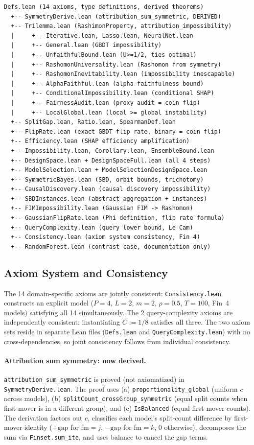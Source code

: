 \documentclass{jmlr}
\begin{document}
{\small
\begin{verbatim}
Defs.lean (14 axioms, type definitions, derived theorems)
  +-- SymmetryDerive.lean (attribution_sum_symmetric, DERIVED)
  +-- Trilemma.lean (RashimonProperty, attribution_impossibility)
  |     +-- Iterative.lean, Lasso.lean, NeuralNet.lean
  |     +-- General.lean (GBDT impossibility)
  |     +-- UnfaithfulBound.lean (U>=1/2, ties optimal)
  |     +-- RashomonUniversality.lean (Rashomon from symmetry)
  |     +-- RashomonInevitability.lean (impossibility inescapable)
  |     +-- AlphaFaithful.lean (alpha-faithfulness bound)
  |     +-- ConditionalImpossibility.lean (conditional SHAP)
  |     +-- FairnessAudit.lean (proxy audit = coin flip)
  |     +-- LocalGlobal.lean (local >= global instability)
  +-- SplitGap.lean, Ratio.lean, SpearmanDef.lean
  +-- FlipRate.lean (exact GBDT flip rate, binary = coin flip)
  +-- Efficiency.lean (SHAP efficiency amplification)
  +-- Impossibility.lean, Corollary.lean, EnsembleBound.lean
  +-- DesignSpace.lean + DesignSpaceFull.lean (all 4 steps)
  +-- ModelSelection.lean + ModelSelectionDesignSpace.lean
  +-- SymmetricBayes.lean (SBD, orbit bounds, trichotomy)
  +-- CausalDiscovery.lean (causal discovery impossibility)
  +-- SBDInstances.lean (abstract aggregation + instances)
  +-- FIMImpossibility.lean (Gaussian FIM -> Rashomon)
  +-- GaussianFlipRate.lean (Phi definition, flip rate formula)
  +-- QueryComplexity.lean (query lower bound, Le Cam)
  +-- Consistency.lean (axiom system consistency, Fin 4)
  +-- RandomForest.lean (contrast case, documentation only)
\end{verbatim}
}

\subsection{Axiom System and Consistency}

The 14 domain-specific axioms are jointly consistent: \texttt{Consistency.lean} constructs an explicit model ($P{=}4$, $L{=}2$, $m{=}2$, $\rho{=}0.5$, $T{=}100$, Fin~4 models) satisfying all 14 simultaneously. The 2 query-complexity axioms are independently consistent: instantiating $C := 1/8$ satisfies all three. The two axiom sets reside in separate Lean files (\texttt{Defs.lean} and \texttt{QueryComplexity.lean}) with no cross-dependencies, so joint consistency follows from individual consistency.

\paragraph{Attribution sum symmetry: now derived.}
\texttt{attribution\_sum\_symmetric} is proved (not axiomatized) in \texttt{SymmetryDerive.lean}. The proof uses (a) \texttt{proportionality\_global} (uniform $c$ across models), (b) \texttt{splitCount\_crossGroup\_symmetric} (equal split counts when first-mover is in a different group), and (c) \texttt{IsBalanced} (equal first-mover counts). The derivation factors out $c$, classifies each model's split-count difference by first-mover identity ($+\text{gap}$ for fm$=j$, $-\text{gap}$ for fm$=k$, $0$ otherwise), decomposes the sum via \texttt{Finset.sum\_ite}, and uses balance to cancel the gap terms.
\end{document}

